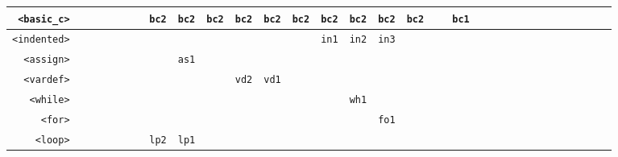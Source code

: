 \documentclass[11pt,a4paper]{article}
\newcommand*\id[1]{\texttt{#1}}
\begin{document}
\begin{table}[H]
\begin{adjustbox}{width=\textwidth}
\begin{tabular}{|r||c|c|c|c|c|c|c|c|c|c|c|c|c|c|c|c|c|c|c|c|c|c|c|c|}
        \id{<basic\_c>}      & \id{   }                 & \id{   }    & \id{   }  & \id{   }  & \id{bc2}   & \id{bc2}   & \id{bc2}    & \id{bc2}  & \id{bc2}  & \id{bc2}     & \id{bc2} & \id{bc2}    & \id{bc2}  & \id{bc2}     & \id{   }   & \id{bc1} & \id{   } & \id{   }    & \id{   } & \id{   } & \id{   } & \id{   } & \id{   } & \id{   } \\ \hline
        \id{<indented>}      & \id{   }                 & \id{   }    & \id{   }  & \id{   }  & \id{   }   & \id{   }   & \id{   }    & \id{   }  & \id{   }  & \id{   }     & \id{in1} & \id{in2}    & \id{in3}  & \id{   }     & \id{   }   & \id{   } & \id{   } & \id{   }    & \id{   } & \id{   } & \id{   } & \id{   } & \id{   } & \id{   } \\ \hline
        \id{<assign>}        & \id{   }                 & \id{   }    & \id{   }  & \id{   }  & \id{   }   & \id{as1}   & \id{   }    & \id{   }  & \id{   }  & \id{   }     & \id{   } & \id{   }    & \id{   }  & \id{   }     & \id{   }   & \id{   } & \id{   } & \id{   }    & \id{   } & \id{   } & \id{   } & \id{   } & \id{   } & \id{   } \\ \hline
        \id{<vardef>}        & \id{   }                 & \id{   }    & \id{   }  & \id{   }  & \id{   }   & \id{   }   & \id{   }    & \id{vd2}  & \id{vd1}  & \id{   }     & \id{   } & \id{   }    & \id{   }  & \id{   }     & \id{   }   & \id{   } & \id{   } & \id{   }    & \id{   } & \id{   } & \id{   } & \id{   } & \id{   } & \id{   } \\ \hline
        \id{<while>}         & \id{   }                 & \id{   }    & \id{   }  & \id{   }  & \id{   }   & \id{   }   & \id{   }    & \id{   }  & \id{   }  & \id{   }     & \id{   } & \id{wh1}    & \id{   }  & \id{   }     & \id{   }   & \id{   } & \id{   } & \id{   }    & \id{   } & \id{   } & \id{   } & \id{   } & \id{   } & \id{   } \\ \hline
        \id{<for>}           & \id{   }                 & \id{   }    & \id{   }  & \id{   }  & \id{   }   & \id{   }   & \id{   }    & \id{   }  & \id{   }  & \id{   }     & \id{   } & \id{   }    & \id{fo1}  & \id{   }     & \id{   }   & \id{   } & \id{   } & \id{   }    & \id{   } & \id{   } & \id{   } & \id{   } & \id{   } & \id{   } \\ \hline
        \id{<loop>}          & \id{   }                 & \id{   }    & \id{   }  & \id{   }  & \id{lp2}   & \id{lp1}   & \id{   }    & \id{   }  & \id{   }  & \id{   }     & \id{   } & \id{   }    & \id{   }  & \id{   }     & \id{   }   & \id{   } & \id{   } & \id{   }    & \id{   } & \id{   } & \id{   } & \id{   } & \id{   } & \id{   } \\ \hline

\end{tabular}
\end{adjustbox}
\end{table}
\end{document}
